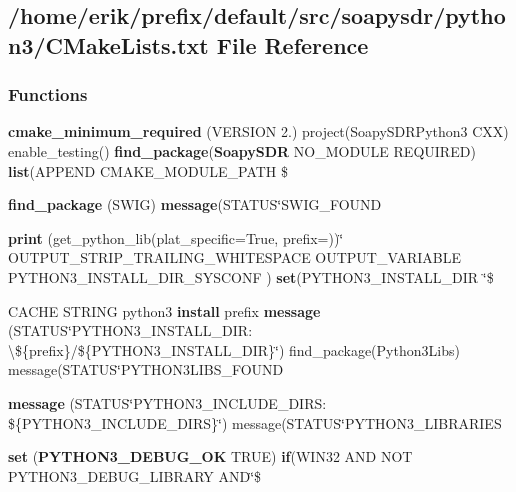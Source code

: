 \subsection{/home/erik/prefix/default/src/soapysdr/python3/\+C\+Make\+Lists.txt File Reference}
\label{soapysdr_2python3_2CMakeLists_8txt}
\subsubsection*{Functions}
\begin{DoxyCompactItemize}
\item 
{\bf cmake\+\_\+minimum\+\_\+required} (V\+E\+R\+S\+I\+ON 2.) project(Soapy\+S\+D\+R\+Python3 C\+XX) enable\+\_\+testing() {\bf find\+\_\+package}({\bf Soapy\+S\+DR} N\+O\+\_\+\+M\+O\+D\+U\+LE R\+E\+Q\+U\+I\+R\+ED) {\bf list}(A\+P\+P\+E\+ND C\+M\+A\+K\+E\+\_\+\+M\+O\+D\+U\+L\+E\+\_\+\+P\+A\+TH \$
\item 
{\bf find\+\_\+package} (S\+W\+IG) {\bf message}(S\+T\+A\+T\+US\char`\"{}S\+W\+I\+G\+\_\+\+F\+O\+U\+ND
\item 
{\bf print} (get\+\_\+python\+\_\+lib(plat\+\_\+specific=True, prefix=\textquotesingle{}\textquotesingle{}))\char`\"{} O\+U\+T\+P\+U\+T\+\_\+\+S\+T\+R\+I\+P\+\_\+\+T\+R\+A\+I\+L\+I\+N\+G\+\_\+\+W\+H\+I\+T\+E\+S\+P\+A\+CE O\+U\+T\+P\+U\+T\+\_\+\+V\+A\+R\+I\+A\+B\+LE P\+Y\+T\+H\+O\+N3\+\_\+\+I\+N\+S\+T\+A\+L\+L\+\_\+\+D\+I\+R\+\_\+\+S\+Y\+S\+C\+O\+NF ) {\bf set}(P\+Y\+T\+H\+O\+N3\+\_\+\+I\+N\+S\+T\+A\+L\+L\+\_\+\+D\+IR \char`\"{}\$
\item 
C\+A\+C\+HE S\+T\+R\+I\+NG python3 {\bf install} prefix {\bf message} (S\+T\+A\+T\+US\char`\"{}P\+Y\+T\+H\+O\+N3\+\_\+\+I\+N\+S\+T\+A\+L\+L\+\_\+\+D\+I\+R\+: \textbackslash{}\$\{prefix\}/\$\{P\+Y\+T\+H\+O\+N3\+\_\+\+I\+N\+S\+T\+A\+L\+L\+\_\+\+D\+IR\}\char`\"{}) find\+\_\+package(Python3\+Libs) message(S\+T\+A\+T\+US\char`\"{}P\+Y\+T\+H\+O\+N3\+L\+I\+B\+S\+\_\+\+F\+O\+U\+ND
\item 
{\bf message} (S\+T\+A\+T\+US\char`\"{}P\+Y\+T\+H\+O\+N3\+\_\+\+I\+N\+C\+L\+U\+D\+E\+\_\+\+D\+I\+R\+S\+: \$\{P\+Y\+T\+H\+O\+N3\+\_\+\+I\+N\+C\+L\+U\+D\+E\+\_\+\+D\+I\+RS\}\char`\"{}) message(S\+T\+A\+T\+US\char`\"{}P\+Y\+T\+H\+O\+N3\+\_\+\+L\+I\+B\+R\+A\+R\+I\+ES
\item 
{\bf set} ({\bf P\+Y\+T\+H\+O\+N3\+\_\+\+D\+E\+B\+U\+G\+\_\+\+OK} T\+R\+UE) {\bf if}(W\+I\+N32 A\+ND N\+OT P\+Y\+T\+H\+O\+N3\+\_\+\+D\+E\+B\+U\+G\+\_\+\+L\+I\+B\+R\+A\+RY A\+ND\char`\"{}\$

\end{DoxyCompactItemize}
